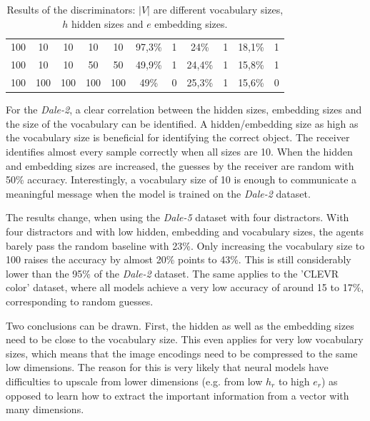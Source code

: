 \begin{table}[h]
\begin{tabular}{ccccc|cc|cc|cc}
        {100} & {10}    & {10}    & {10}    & {10}    & {97,3\%}                            & {1}                                 & {24\%}                                   & {1}             & {18,1\%}          & {1}             \\
        {100} & {10}    & {10}    & {50}    & {50}    & {49,9\%}                            & {1}                                 & {24,4\%}                                 & {1}             & {15,8\%}          & {1}             \\
        {100} & {100}   & {100}   & {100}   & {100}   & {49\%}                              & {0}                                 & {25,3\%}                                 & {1}             & {15,6\%}          & {0}             \\
        \bottomrule
    \end{tabular}
    \caption{Results of the discriminators: $|V|$ are different vocabulary sizes, $h$ hidden sizes and $e$ embedding sizes.}
    \label{tab:results_discriminator}
\end{table}

For the \emph{Dale-2}, a clear correlation between the hidden sizes, embedding sizes and the size of the vocabulary can be identified.
A hidden/embedding size as high as the vocabulary size is beneficial for identifying the correct object.
The receiver identifies almost every sample correctly when all sizes are 10.
When the hidden and embedding sizes are increased, the guesses by the receiver are random with 50\% accuracy.
Interestingly, a vocabulary size of 10 is enough to communicate a meaningful message when the model is trained on the \emph{Dale-2} dataset.

The results change, when using the \emph{Dale-5} dataset with four distractors.
With four distractors and with low hidden, embedding and vocabulary sizes, the agents barely pass the random baseline with 23\%.
Only increasing the vocabulary size to 100 raises the accuracy by almost 20\% points to 43\%.
This is still considerably lower than the 95\% of the \emph{Dale-2} dataset.
The same applies to the 'CLEVR color' dataset, where all models achieve a very low accuracy of around 15 to 17\%, corresponding to random guesses.


Two conclusions can be drawn.
First, the hidden as well as the embedding sizes need to be close to the vocabulary size.
This even applies for very low vocabulary sizes, which means that the image encodings need to be compressed to the same low dimensions.
The reason for this is very likely that neural models have difficulties to upscale from lower dimensions (e.g. from low $h_r$ to high $e_r$) as opposed to learn how to extract the important information from a vector with many dimensions.

